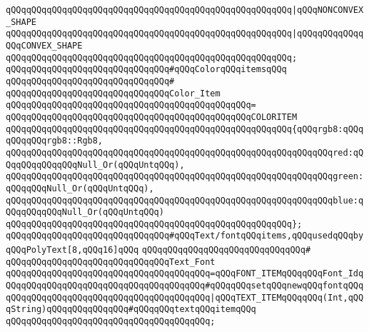 \verb|qQQqqQQqqQQqqQQqqQQqqQQqqQQqqQQqqQQqqQQqqQQqqQQqqQQqqQQq|\verb#|qQQqNONCONVEX_SHAPE#\newline
\verb|qQQqqQQqqQQqqQQqqQQqqQQqqQQqqQQqqQQqqQQqqQQqqQQqqQQqqQQq|\verb#|qQQqqQQqqQQqqQQqCONVEX_SHAPE#\newline
\verb|qQQqqQQqqQQqqQQqqQQqqQQqqQQqqQQqqQQqqQQqqQQqqQQqqQQqqQQq;|\newline
\newline
\verb|qQQqqQQqqQQqqQQqqQQqqQQqqQQqqQQq#qQQqColorqQQqitemsqQQq|\newline
\verb|qQQqqQQqqQQqqQQqqQQqqQQqqQQqqQQq#|\newline
\verb|qQQqqQQqqQQqqQQqqQQqqQQqqQQqqQQqColor_Item|\newline
\verb|qQQqqQQqqQQqqQQqqQQqqQQqqQQqqQQqqQQqqQQqqQQqqQQq=|\newline
\verb|qQQqqQQqqQQqqQQqqQQqqQQqqQQqqQQqqQQqqQQqqQQqqQQqCOLORITEM|\newline
\verb|qQQqqQQqqQQqqQQqqQQqqQQqqQQqqQQqqQQqqQQqqQQqqQQqqQQqqQQq{qQQqrgb8:qQQqqQQqqQQqrgb8::Rgb8,|\newline
\verb|qQQqqQQqqQQqqQQqqQQqqQQqqQQqqQQqqQQqqQQqqQQqqQQqqQQqqQQqqQQqqQQqred:qQQqqQQqqQQqqQQqNull_Or(qQQqUntqQQq),|\newline
\verb|qQQqqQQqqQQqqQQqqQQqqQQqqQQqqQQqqQQqqQQqqQQqqQQqqQQqqQQqqQQqqQQqgreen:qQQqqQQqNull_Or(qQQqUntqQQq),|\newline
\verb|qQQqqQQqqQQqqQQqqQQqqQQqqQQqqQQqqQQqqQQqqQQqqQQqqQQqqQQqqQQqqQQqblue:qQQqqQQqqQQqNull_Or(qQQqUntqQQq)|\newline
\verb|qQQqqQQqqQQqqQQqqQQqqQQqqQQqqQQqqQQqqQQqqQQqqQQqqQQqqQQq};|\newline
\newline
\verb|qQQqqQQqqQQqqQQqqQQqqQQqqQQqqQQq#qQQqText/fontqQQqitems,qQQqusedqQQqbyqQQqPolyText[8,qQQq16]qQQq|\newline
\verb|qQQqqQQqqQQqqQQqqQQqqQQqqQQqqQQq#|\newline
\verb|qQQqqQQqqQQqqQQqqQQqqQQqqQQqqQQqText_Font|\newline
\verb|qQQqqQQqqQQqqQQqqQQqqQQqqQQqqQQqqQQqqQQq=qQQqFONT_ITEMqQQqqQQqFont_IdqQQqqQQqqQQqqQQqqQQqqQQqqQQqqQQqqQQqqQQq#qQQqqQQqsetqQQqnewqQQqfontqQQq|\newline
\verb|qQQqqQQqqQQqqQQqqQQqqQQqqQQqqQQqqQQqqQQq|\verb#|qQQqTEXT_ITEMqQQqqQQq(Int,qQQqString)qQQqqQQqqQQqqQQq#\verb|#qQQqqQQqtextqQQqitemqQQq|\newline
\verb|qQQqqQQqqQQqqQQqqQQqqQQqqQQqqQQqqQQqqQQq;|\newline
\newline

